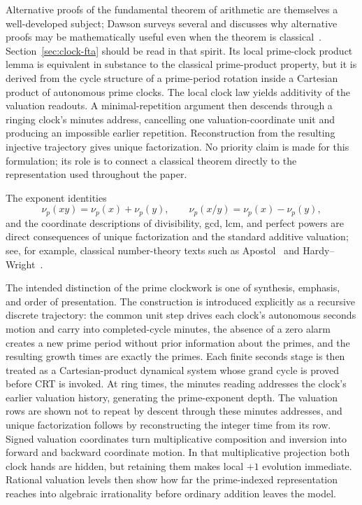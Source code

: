 \documentclass[11pt,a4paper]{article}
\theoremstyle{clockplain}
\theoremstyle{definition}
\theoremstyle{remark}
\begin{document}
Alternative proofs of the fundamental theorem of arithmetic are themselves a well-developed subject; Dawson surveys several and discusses why alternative proofs may be mathematically useful even when the theorem is classical~\cite{Dawson2015}. Section~\ref{sec:clock-fta} should be read in that spirit. Its local prime-clock product lemma is equivalent in substance to the classical prime-product property, but it is derived from the cycle structure of a prime-period rotation inside a Cartesian product of autonomous prime clocks. The local clock law yields additivity of the valuation readouts. A minimal-repetition argument then descends through a ringing clock's minutes address, cancelling one valuation-coordinate unit and producing an impossible earlier repetition. Reconstruction from the resulting injective trajectory gives unique factorization. No priority claim is made for this formulation; its role is to connect a classical theorem directly to the representation used throughout the paper.

The exponent identities
\[
\nu_p(xy)=\nu_p(x)+\nu_p(y),
\qquad
\nu_p(x/y)=\nu_p(x)-\nu_p(y),
\]
and the coordinate descriptions of divisibility, gcd, lcm, and perfect powers are direct consequences of unique factorization and the standard additive valuation; see, for example, classical number-theory texts such as Apostol~\cite{Apostol1976} and Hardy--Wright~\cite{HardyWright2008}.

The intended distinction of the prime clockwork is one of synthesis, emphasis, and order of presentation. The construction is introduced explicitly as a recursive discrete trajectory: the common unit step drives each clock's autonomous seconds motion and carry into completed-cycle minutes, the absence of a zero alarm creates a new prime period without prior information about the primes, and the resulting growth times are exactly the primes. Each finite seconds stage is then treated as a Cartesian-product dynamical system whose grand cycle is proved before CRT is invoked. At ring times, the minutes reading addresses the clock's earlier valuation history, generating the prime-exponent depth. The valuation rows are shown not to repeat by descent through these minutes addresses, and unique factorization follows by reconstructing the integer time from its row. Signed valuation coordinates turn multiplicative composition and inversion into forward and backward coordinate motion. In that multiplicative projection both clock hands are hidden, but retaining them makes local $+1$ evolution immediate. Rational valuation levels then show how far the prime-indexed representation reaches into algebraic irrationality before ordinary addition leaves the model.
\end{document}
